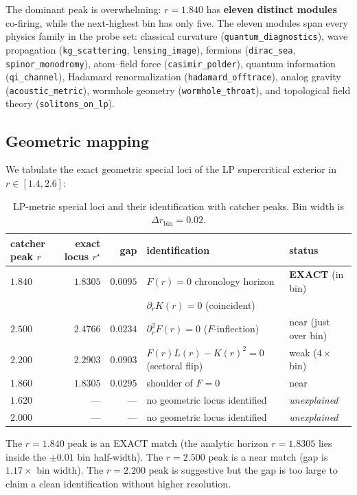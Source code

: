 \documentclass[11pt,letterpaper]{article}
\begin{document}
The dominant peak is overwhelming: $r = 1.840$ has \textbf{eleven distinct modules} co-firing, while the next-highest bin has only five. The eleven modules span every physics family in the probe set: classical curvature (\texttt{quantum\_diagnostics}), wave propagation (\texttt{kg\_scattering}, \texttt{lensing\_image}), fermions (\texttt{dirac\_sea}, \texttt{spinor\_monodromy}), atom--field force (\texttt{casimir\_polder}), quantum information (\texttt{qi\_channel}), Hadamard renormalization (\texttt{hadamard\_offtrace}), analog gravity (\texttt{acoustic\_metric}), wormhole geometry (\texttt{wormhole\_throat}), and topological field theory (\texttt{solitons\_on\_lp}).

\subsection{Geometric mapping}\label{ssec:mapping}

We tabulate the exact geometric special loci of the LP supercritical exterior in $r \in [1.4, 2.6]$:

\begin{table}[h]
\centering
\caption{LP-metric special loci and their identification with catcher peaks. Bin width is $\Delta r_{\mathrm{bin}} = 0.02$.}
\label{tab:mapping}
\begin{tabular}{lrr l l}
\toprule
catcher peak $r$ & exact locus $r^{\star}$ & gap & identification & status \\
\midrule
$1.840$ & $1.8305$ & $0.0095$ & $F(r) = 0$ chronology horizon & \textbf{EXACT} (in bin) \\
        &          &          & $\partial_r K(r) = 0$ (coincident) & \\
$2.500$ & $2.4766$ & $0.0234$ & $\partial_r^2 F(r) = 0$ ($F$-inflection) & near (just over bin) \\
$2.200$ & $2.2903$ & $0.0903$ & $F(r) L(r) - K(r)^2 = 0$ (sectoral flip) & weak ($4\times$ bin) \\
$1.860$ & $1.8305$ & $0.0295$ & shoulder of $F = 0$ & near \\
$1.620$ & --- & --- & no geometric locus identified & \emph{unexplained} \\
$2.000$ & --- & --- & no geometric locus identified & \emph{unexplained} \\
\bottomrule
\end{tabular}
\end{table}

The $r = 1.840$ peak is an EXACT match (the analytic horizon $r = 1.8305$ lies inside the $\pm 0.01$ bin half-width). The $r = 2.500$ peak is a near match (gap is $1.17\times$ bin width). The $r = 2.200$ peak is suggestive but the gap is too large to claim a clean identification without higher resolution.
\end{document}
